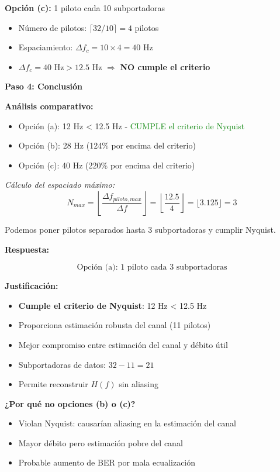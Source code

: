 \documentclass[11pt,a4paper]{article}
\begin{document}
\textbf{Opción (c):} 1 piloto cada 10 subportadoras
\begin{itemize}
    \item Número de pilotos: $\lceil 32/10 \rceil = 4$ pilotos
    \item Espaciamiento: $\Delta f_c = 10 \times 4 = 40$ Hz
    \item $\Delta f_c = 40 \text{ Hz} > 12.5$ Hz $\Rightarrow$ \textbf{NO cumple el criterio}
\end{itemize}

\textbf{Paso 4: Conclusión}

\textbf{Análisis comparativo:}
\begin{itemize}
    \item Opción (a): 12 Hz < 12.5 Hz - \textcolor{green}{CUMPLE el criterio de Nyquist}
    \item Opción (b): 28 Hz (124\% por encima del criterio)
    \item Opción (c): 40 Hz (220\% por encima del criterio)
\end{itemize}

\textit{Cálculo del espaciado máximo:}
\[
N_{max} = \left\lfloor \frac{\Delta f_{piloto,max}}{\Delta f} \right\rfloor = \left\lfloor \frac{12.5}{4} \right\rfloor = \lfloor 3.125 \rfloor = 3
\]

Podemos poner pilotos separados hasta 3 subportadoras y cumplir Nyquist.

\textbf{Respuesta:}

\[
\boxed{\text{Opción (a): 1 piloto cada 3 subportadoras}}
\]

\textbf{Justificación:}
\begin{itemize}
    \item \textbf{Cumple el criterio de Nyquist}: 12 Hz < 12.5 Hz
    \item Proporciona estimación robusta del canal (11 pilotos)
    \item Mejor compromiso entre estimación del canal y débito útil
    \item Subportadoras de datos: $32 - 11 = 21$
    \item Permite reconstruir $H(f)$ sin aliasing
\end{itemize}

\textbf{¿Por qué no opciones (b) o (c)?}
\begin{itemize}
    \item Violan Nyquist: causarían aliasing en la estimación del canal
    \item Mayor débito pero estimación pobre del canal
    \item Probable aumento de BER por mala ecualización
\end{itemize}
\end{document}
